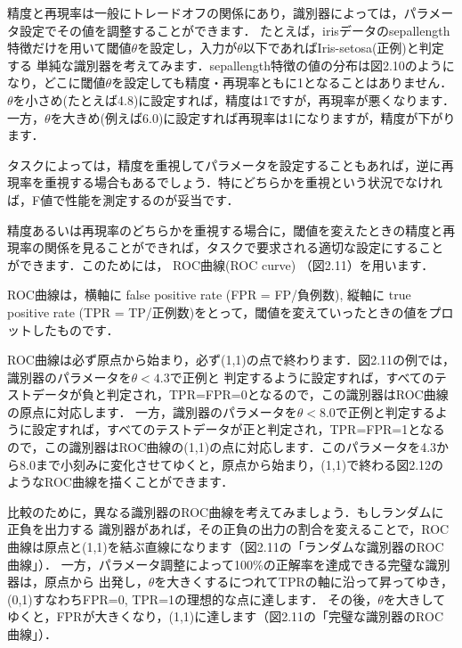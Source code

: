 
精度と再現率は一般にトレードオフの関係にあり，識別器によっては，パラメータ設定でその値を調整することができます．
たとえば，irisデータのsepallength特徴だけを用いて閾値$\theta$を設定し，入力が$\theta$以下であればIris-setosa(正例)と判定する
単純な識別器を考えてみます．sepallength特徴の値の分布は図2.10のようになり，どこに閾値$\theta$を設定しても精度・再現率ともに1となることはありません．$\theta$を小さめ(たとえば4.8)に設定すれば，精度は1ですが，再現率が悪くなります．一方，$\theta$を大きめ(例えば6.0)に設定すれば再現率は1になりますが，精度が下がります．


タスクによっては，精度を重視してパラメータを設定することもあれば，逆に再現率を重視する場合もあるでしょう．特にどちらかを重視という状況でなければ，F値で性能を測定するのが妥当です．


精度あるいは再現率のどちらかを重視する場合に，閾値を変えたときの精度と再現率の関係を見ることができれば，タスクで要求される適切な設定にすることができます．このためには，
ROC曲線(ROC curve)
（図2.11）を用います．


ROC曲線は，横軸に false positive rate (FPR = FP/負例数), 縦軸に true positive rate (TPR = TP/正例数)をとって，閾値を変えていったときの値をプロットしたものです．

ROC曲線は必ず原点から始まり，必ず(1,1)の点で終わります．図2.11の例では，識別器のパラメータを$\theta < 4.3$で正例と
判定するように設定すれば，すべてのテストデータが負と判定され，TPR=FPR=0となるので，この識別器はROC曲線の原点に対応します．
一方，識別器のパラメータを$\theta < 8.0$で正例と判定するように設定すれば，すべてのテストデータが正と判定され，TPR=FPR=1となるので，この識別器はROC曲線の(1,1)の点に対応します．このパラメータを4.3から8.0まで小刻みに変化させてゆくと，原点から始まり，(1,1)で終わる図2.12のようなROC曲線を描くことができます．



比較のために，異なる識別器のROC曲線を考えてみましょう．もしランダムに正負を出力する
識別器があれば，その正負の出力の割合を変えることで，ROC曲線は原点と(1,1)を結ぶ直線になります（図2.11の「ランダムな識別器のROC曲線」）．
一方，パラメータ調整によって100\%の正解率を達成できる完璧な識別器は，原点から
出発し，$\theta$を大きくするにつれてTPRの軸に沿って昇ってゆき，(0,1)すなわちFPR=0, TPR=1の理想的な点に達します．
その後，$\theta$を大きしてゆくと，FPRが大きくなり，(1,1)に達します（図2.11の「完璧な識別器のROC曲線」）．

